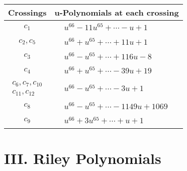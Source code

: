 \documentclass[1p]{elsarticle_modified}
\theoremstyle{definition}
\begin{document}
\begin{tabular}{m{50pt}|m{274pt}}
Crossings & \hspace{64pt}u-Polynomials at each crossing \\
\hline $$\begin{aligned}c_{1}\end{aligned}$$&$\begin{aligned}
&u^{66}-11 u^{65}+\cdots- u+1
\end{aligned}$\\
\hline $$\begin{aligned}c_{2},c_{5}\end{aligned}$$&$\begin{aligned}
&u^{66}+u^{65}+\cdots+11 u+1
\end{aligned}$\\
\hline $$\begin{aligned}c_{3}\end{aligned}$$&$\begin{aligned}
&u^{66}- u^{65}+\cdots+116 u-8
\end{aligned}$\\
\hline $$\begin{aligned}c_{4}\end{aligned}$$&$\begin{aligned}
&u^{66}+u^{65}+\cdots-39 u+19
\end{aligned}$\\
\hline $$\begin{aligned}c_{6},c_{7},c_{10}\\c_{11},c_{12}\end{aligned}$$&$\begin{aligned}
&u^{66}- u^{65}+\cdots-3 u+1
\end{aligned}$\\
\hline $$\begin{aligned}c_{8}\end{aligned}$$&$\begin{aligned}
&u^{66}- u^{65}+\cdots-1149 u+1069
\end{aligned}$\\
\hline $$\begin{aligned}c_{9}\end{aligned}$$&$\begin{aligned}
&u^{66}+3 u^{65}+\cdots+u+1
\end{aligned}$\\
\hline
\end{tabular}\newpage\renewcommand{\arraystretch}{1}
\centering \section*{ III. Riley Polynomials}
\end{document}
